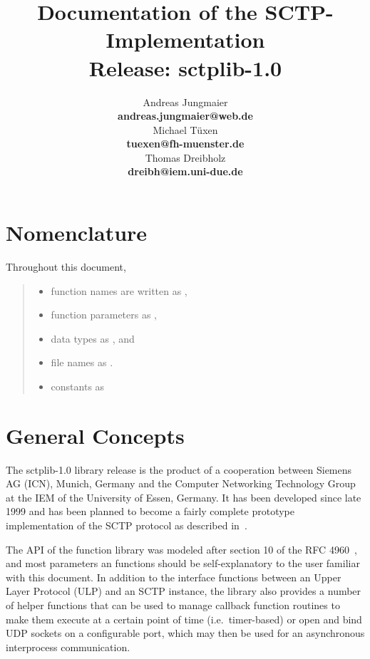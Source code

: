 \documentclass[10pt]{article}
\title{Documentation of the SCTP-Implementation\\
	 Release: sctplib-1.0}
\author{Andreas Jungmaier\\
    \textbf{andreas.jungmaier@web.de}\\
	Michael T\"{u}xen\\
	\textbf{tuexen@fh-muenster.de}\\
   Thomas Dreibholz\\
   \textbf{dreibh@iem.uni-due.de}}
\newcommand{\p}{\medskip \noindent }
\begin{document}
\maketitle

\fancyhf{}
\section{Nomenclature}
Throughout this document, 
\begin{quote}
\begin{itemize}
\item function names are written as ,
\item function parameters as , 
\item data types as , and
\item file names as .
\item constants as 
\end{itemize}
\end{quote}

\section{General Concepts}
The sctplib-1.0 library release is the product of a cooperation between
Siemens AG (ICN), Munich, Germany and the Computer Networking Technology Group
at the IEM of the University of Essen, Germany.
It has been developed since late 1999 and has been planned to become a fairly
complete prototype implementation of the SCTP protocol as described in~\cite{RFC4960}.

\p
The API of the function library was modeled after section 10 of the
RFC 4960~\cite{RFC4960},
and most parameters an functions should be self-explanatory to the user familiar
with this document.
In addition to the interface functions between an Upper Layer Protocol (ULP)
and an SCTP instance,
the library also provides a number of helper functions that can be used
to manage callback function routines to make them execute at a certain point of 
time (i.e.\ timer-based)
or open and bind  UDP sockets on a configurable port, which may then be used
for an asynchronous interprocess communication.
\end{document}
